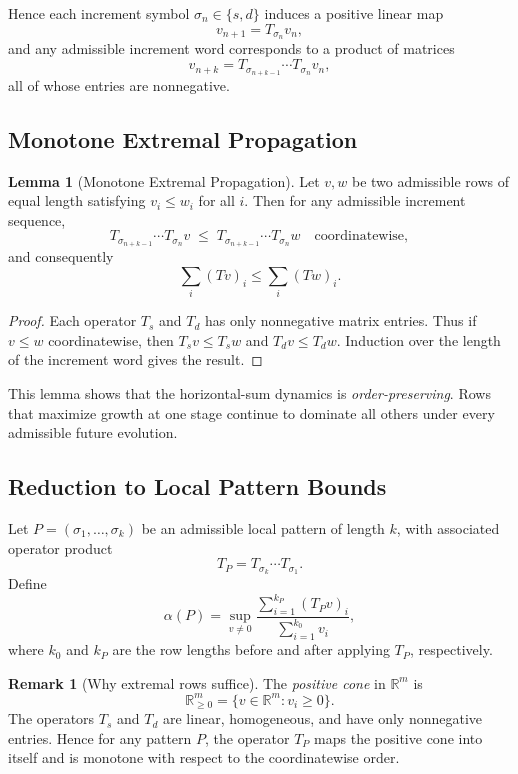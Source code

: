\documentclass[12pt, oneside]{article}   	%
\numberwithin{equation}{section}          %
\theoremstyle{definition}
\newtheorem{lemma}[theorem]{Lemma}
\newtheorem*{remark}{Remark}
\begin{document}
Hence each increment symbol $\sigma_n\in\{s,d\}$ induces a positive linear map
\[
v_{n+1} = T_{\sigma_n} v_n,
\]
and any admissible increment word corresponds to a product of matrices
\[
v_{n+k} = T_{\sigma_{n+k-1}}\cdots T_{\sigma_n} v_n,
\]
all of whose entries are nonnegative.


\subsection{Monotone Extremal Propagation}

\begin{lemma}[Monotone Extremal Propagation]
\label{lem:monotone-propagation}
Let $v,w$ be two admissible rows of equal length satisfying
$v_i \le w_i$ for all $i$. Then for any admissible increment sequence,
\[
T_{\sigma_{n+k-1}}\cdots T_{\sigma_n} v
\;\le\;
T_{\sigma_{n+k-1}}\cdots T_{\sigma_n} w
\quad \text{coordinatewise},
\]
and consequently
\[
\sum_i (T v)_i \le \sum_i (T w)_i.
\]
\end{lemma}

\begin{proof}
Each operator $T_s$ and $T_d$ has only nonnegative matrix entries. Thus
if $v\le w$ coordinatewise, then $T_s v \le T_s w$ and $T_d v \le T_d w$.
Induction over the length of the increment word gives the result.
\end{proof}

This lemma shows that the horizontal-sum dynamics is \emph{order-preserving}.
Rows that maximize growth at one stage continue to dominate all others
under every admissible future evolution.


\subsection{Reduction to Local Pattern Bounds}

Let $P = (\sigma_1,\dots,\sigma_k)$ be an admissible local pattern of length $k$,
with associated operator product
\[
T_P = T_{\sigma_k}\cdots T_{\sigma_1}.
\]
Define
\[
\alpha(P)
= \sup_{v\neq 0}
\frac{\sum_{i=1}^{k_P} (T_P v)_i}{\sum_{i=1}^{k_0} v_i},
\]
where $k_0$ and $k_P$ are the row lengths before and after applying $T_P$, respectively.

\begin{remark}[Why extremal rows suffice]
The \emph{positive cone} in $\mathbb{R}^m$ is
\[
\mathbb{R}^m_{\ge 0} = \{v \in \mathbb{R}^m : v_i \ge 0\}.
\]
The operators $T_s$ and $T_d$ are linear, homogeneous, and have only
nonnegative entries.  Hence for any pattern $P$, the operator $T_P$ maps the
positive cone into itself and is monotone with respect to the coordinatewise
order.
\end{remark}
\end{document}
